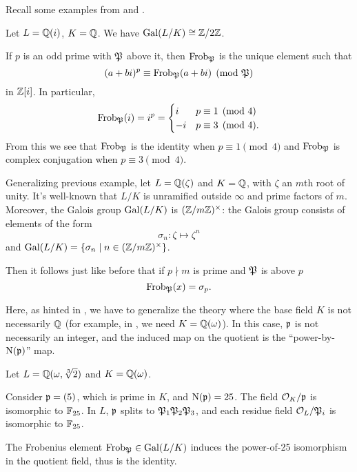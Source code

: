 Recall some examples from  and .
\begin{example}
	Let $L = \mathbb Q(i)$, $K = \mathbb Q$.
	We have $\operatorname{Gal}(L/K) \cong \mathbb Z/2\mathbb Z$.

	If $p$ is an odd prime with $\mathfrak P$ above it,
	then $\mathrm{Frob}_\mathfrak P$ is the unique element such that
	\[ (a+bi)^p \equiv \mathrm{Frob}_\mathfrak P(a+bi) \pmod{\mathfrak P} \]
	in $\mathbb Z[i]$. In particular,
	\[ \mathrm{Frob}_\mathfrak P(i) = i^p =
		\begin{cases}
			i & p \equiv 1 \pmod 4 \\
			-i & p \equiv 3 \pmod 4.
		\end{cases}
	\]
	From this we see that $\mathrm{Frob}_\mathfrak P$ is the identity when $p \equiv 1 \pmod 4$
	and $\mathrm{Frob}_\mathfrak P$ is complex conjugation when $p \equiv 3 \pmod 4$.
\end{example}
\begin{example}
	Generalizing previous example, let $L = \mathbb Q(\zeta)$ and $K = \mathbb Q$,
	with $\zeta$ an $m$th root of unity.
	It's well-known that $L/K$ is unramified outside $\infty$
	and prime factors of $m$.
	Moreover, the Galois group $\operatorname{Gal}(L/K)$ is $(\mathbb Z/m\mathbb Z)^\times$:
	the Galois group consists of elements of the form
	\[ \sigma_n \colon \zeta \mapsto \zeta^n \]
	and $\operatorname{Gal}(L/K) = \left\{ \sigma_n \mid n \in (\mathbb Z/m\mathbb Z)^\times \right\}$.

	Then it follows just like before that
	if $p \nmid m$ is prime and $\mathfrak P$ is above $p$
	\[ \mathrm{Frob}_\mathfrak P(x) = \sigma_p. \]
\end{example}

Here, as hinted in , we have to generalize the
theory where the base field $K$ is not necessarily $\mathbb Q$ (for example, in
, we need $K=\mathbb Q(\omega)$).
In this case, $\mathfrak p$ is
not necessarily an integer, and the induced map on the quotient is the
``power-by-$\operatorname{N}(\mathfrak p)$'' map.

\begin{example}
	Let $L=\mathbb Q(\omega, \sqrt[3]{2})$ and $K=\mathbb Q(\omega)$.

	Consider $\mathfrak p=(5)$, which is prime in $K$, and $\operatorname{N}(\mathfrak p)=25$.
	The field $\mathcal O_K/\mathfrak p$ is isomorphic to $\mathbb F_{25}$.
	In $L$, $\mathfrak p$ splits to $\mathfrak P_1 \mathfrak P_2 \mathfrak P_3$, and each residue field
	$\mathcal O_L/\mathfrak P_i$ is isomorphic to $\mathbb F_{25}$.

	The Frobenius element $\mathrm{Frob}_\mathfrak P \in \operatorname{Gal}(L/K)$ induces the power-of-25
	isomorphism in the quotient field, thus is the identity.
\end{example}


